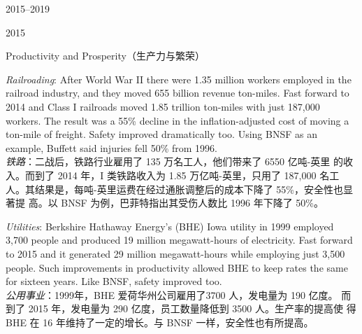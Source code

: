 \begin{chapter}{2015--2019}
\begin{section}{2015}
\begin{subsection}{Productivity and Prosperity（生产力与繁荣）}
\begin{verseparallel}
  {
    \textit{Railroading}: After World War II there were 1.35 million workers
    employed in the railroad industry, and they moved 655 billion revenue
    ton-miles. Fast forward to 2014 and Class I railroads moved 1.85 trillion
    ton-miles with just 187,000 workers. The result was a 55\% decline in the
    inflation-adjusted cost of moving a ton-mile of freight. Safety improved
    dramatically too. Using BNSF as an example, Buffett said injuries fell 50\%
    from 1996. \\
  }
  {
    \textit{铁路}：二战后，铁路行业雇用了 135 万名工人，他们带来了 6550 亿吨-英里
    的收入。而到了 2014 年，I 类铁路收入为 1.85 万亿吨-英里，只用了 187,000 名工
    人。其结果是，每吨-英里运费在经过通胀调整后的成本下降了 55\%，安全性也显著提
    高。以 BNSF 为例，巴菲特指出其受伤人数比 1996 年下降了 50\%。
  }
\end{verseparallel}

\begin{verseparallel}
  {
    \textit{Utilities}: Berkshire Hathaway Energy's (BHE) Iowa utility in 1999
    employed 3,700 people and produced 19 million megawatt-hours of electricity.
    Fast forward to 2015 and it generated 29 million megawatt-hours while
    employing just 3,500 people. Such improvements in productivity allowed BHE
    to keep rates the same for sixteen years. Like BNSF, safety improved too. \\
  }
  {
    \textit{公用事业}：1999年，BHE 爱荷华州公司雇用了3700 人，发电量为 190 亿度。
    而到了 2015 年，发电量为 290 亿度，员工数量降低到 3500 人。生产率的提高使
    得 BHE 在 16 年维持了一定的增长。与 BNSF 一样，安全性也有所提高。
  }
\end{verseparallel}


\end{subsection}
\end{section}
\end{chapter}
